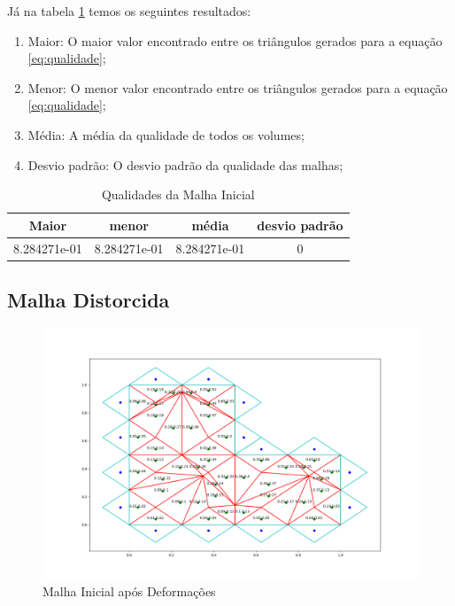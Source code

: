 Já na tabela \ref{tab:qualidades-malha-inicial} temos os seguintes resultados:

\begin{enumerate}
    \item Maior: O maior valor encontrado entre os triângulos gerados para a equação \ref{eq:qualidade};
    \item Menor: O menor valor encontrado entre os triângulos gerados para a equação \ref{eq:qualidade};
    \item Média: A média da qualidade de todos os volumes;
    \item Desvio padrão: O desvio padrão da qualidade das malhas;
\end{enumerate}

\begin{table}[h!]
 \centering
 \par\caption{Qualidades da Malha Inicial}
\begin{tabular}{c|c|c|c}
 Maior&menor&média&desvio padrão\\\hline\hline
 8.284271e-01&8.284271e-01&8.284271e-01&0\\\hline
 \end{tabular}
 \label{tab:qualidades-malha-inicial}
\end{table}

\newpage
\subsection{Malha Distorcida}

\begin{figure}[ht]
    \centering
    \includegraphics[width=1\linewidth]{fig/malha-ruim.png}
    \caption{Malha Inicial após Deformações}
    \label{fig:malha-ruim}
\end{figure}

